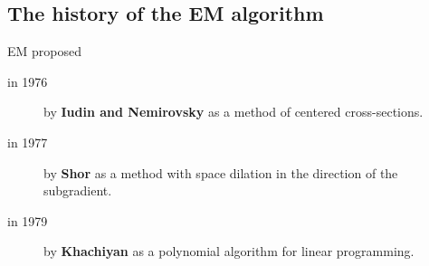 \subsection{The history of the EM algorithm}

\begin{frame}{EM proposed}
\begin{description}
\item[in 1976] by \textbf{Iudin and Nemirovsky} as a method of centered cross-sections.
\item[in 1977] by \textbf{Shor} as a method with space dilation in the direction of the subgradient.
\item[in 1979] by \textbf{Khachiyan} as a polynomial algorithm for linear programming.
\end{description}
\end{frame}